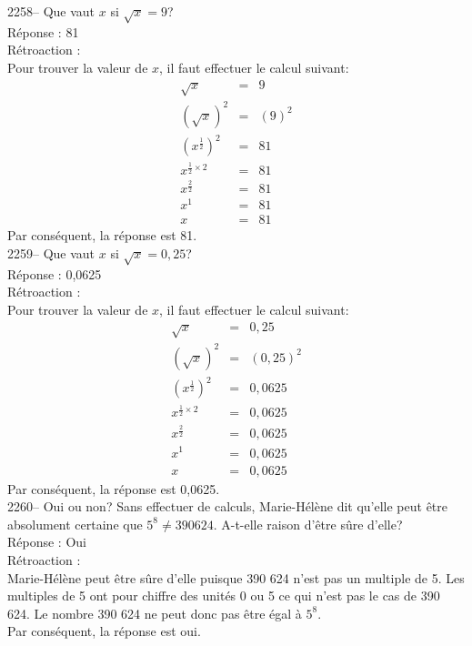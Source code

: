 \documentclass[letterpaper, 12pt]{article}
\begin{document}
2258-- Que vaut $x$ si $\sqrt{x}=9$?\\

R\'eponse : 81\\

R\'etroaction :\\
Pour trouver la valeur de $x$, il faut effectuer le calcul suivant:
\begin{eqnarray*}
\sqrt{x}&=&9\\
\left(\sqrt{x}\right)^{2}&=&(9)^{2}\\
\left(x^{\frac{1}{2}}\right)^{2}&=&81\\
x^{\frac{1}{2}\times2}&=&81\\
x^{\frac{2}{2}}&=&81\\
x^{1}&=&81\\
x&=&81
\end{eqnarray*}
Par cons\'equent, la r\'eponse est 81.\\

2259--  Que vaut $x$ si $\sqrt{x}=0,25$?\\

R\'eponse : 0,0625\\

R\'etroaction :\\
Pour trouver la valeur de $x$, il faut effectuer le calcul suivant:
\begin{eqnarray*}
\sqrt{x}&=&0,25\\
\left(\sqrt{x}\right)^{2}&=&(0,25)^{2}\\
\left(x^{\frac{1}{2}}\right)^{2}&=&0,0625\\
x^{\frac{1}{2}\times2}&=&0,0625\\
x^{\frac{2}{2}}&=&0,0625\\
x^{1}&=&0,0625\\
x&=&0,0625
\end{eqnarray*}
Par cons\'equent, la r\'eponse est 0,0625.\\

2260-- Oui ou non? Sans effectuer de calculs, Marie-H\'el\`ene dit qu'elle peut \^etre absolument certaine que $5^{8}\neq390 624$. A-t-elle raison d'\^etre s\^ure d'elle?\\

R\'eponse : Oui\\

R\'etroaction :\\
Marie-H\'el\`ene peut \^etre s\^ure d'elle puisque 390 624 n'est pas un multiple de 5. Les multiples de 5 ont pour chiffre des unit\'es 0 ou 5 ce qui n'est pas le cas de 390 624. Le nombre 390 624 ne peut donc pas \^etre \'egal \`a $5^{8}$.\\
Par cons\'equent, la r\'eponse est oui.\\
\end{document}
